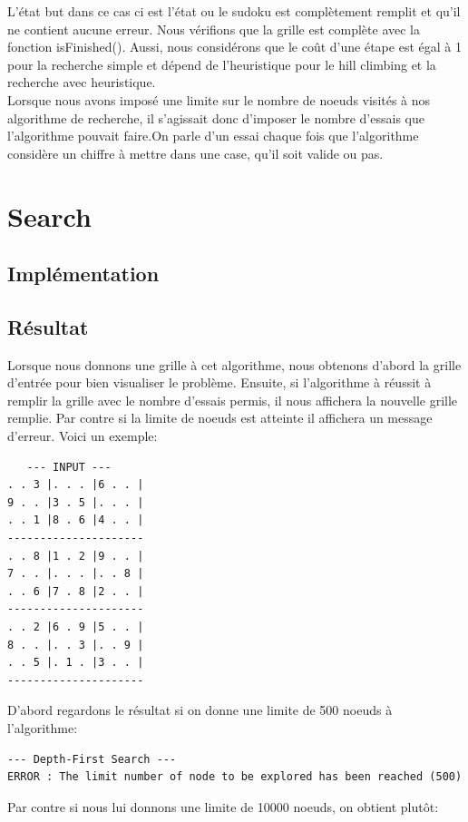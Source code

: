 \documentclass[a4paper,10pt]{article}
\begin{document}
L'état but dans ce cas ci est l'état ou le sudoku est complètement remplit et qu'il ne contient aucune erreur. Nous vérifions que la grille est complète avec la fonction isFinished(). Aussi, nous considérons que le coût d'une étape est égal à 1 pour la recherche simple et dépend de l'heuristique pour le hill climbing et la recherche avec heuristique.\\

Lorsque nous avons imposé une limite sur le nombre de noeuds visités à nos algorithme de recherche, il s'agissait donc d'imposer le nombre d'essais que l'algorithme pouvait faire.On parle d'un essai chaque fois que l'algorithme considère un chiffre à mettre dans une case, qu'il soit valide ou pas. 

\section{Search}
\subsection{Implémentation}

\subsection{Résultat}
Lorsque nous donnons une grille à cet algorithme, nous obtenons  d'abord la grille d'entrée pour bien visualiser le problème. Ensuite, si l'algorithme à réussit à remplir la grille avec le nombre d'essais permis, il nous affichera la nouvelle grille remplie. Par contre si la limite de noeuds est atteinte il affichera un message d'erreur. Voici un exemple:

\begin{verbatim}
   --- INPUT ---
. . 3 |. . . |6 . . |
9 . . |3 . 5 |. . . |
. . 1 |8 . 6 |4 . . |
---------------------
. . 8 |1 . 2 |9 . . |
7 . . |. . . |. . 8 |
. . 6 |7 . 8 |2 . . |
---------------------
. . 2 |6 . 9 |5 . . |
8 . . |. . 3 |. . 9 |
. . 5 |. 1 . |3 . . |
---------------------
\end{verbatim}

D'abord regardons le résultat si on donne une limite de 500 noeuds à l'algorithme:

\begin{verbatim}
--- Depth-First Search ---
ERROR : The limit number of node to be explored has been reached (500)
\end{verbatim}

Par contre si nous lui donnons une limite de 10000 noeuds, on obtient plutôt:
\end{document}
